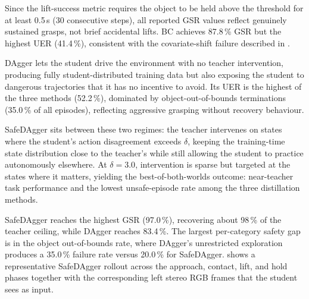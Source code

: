 Since the lift-success metric requires the object to be held above the threshold for at least 0.5\,s (30 consecutive steps), all reported \ac{GSR} values reflect genuinely sustained grasps, not brief accidental lifts.
\ac{BC} achieves 87.8\,\% \ac{GSR} but the highest \ac{UER} (41.4\,\%), consistent with the covariate-shift failure described in .

DAgger lets the student drive the environment with no teacher intervention, producing fully student-distributed training data but also exposing the student to dangerous trajectories that it has no incentive to avoid.
Its \ac{UER} is the highest of the three methods (52.2\,\%), dominated by object-out-of-bounds terminations (35.0\,\% of all episodes), reflecting aggressive grasping without recovery behaviour.

SafeDAgger sits between these two regimes: the teacher intervenes on states where the student's action disagreement exceeds $\delta$, keeping the training-time state distribution close to the teacher's while still allowing the student to practice autonomously elsewhere.
At $\delta = 3.0$, intervention is sparse but targeted at the states where it matters, yielding the best-of-both-worlds outcome: near-teacher task performance and the lowest unsafe-episode rate among the three distillation methods.

SafeDAgger reaches the highest \ac{GSR} (97.0\,\%), recovering about 98\,\% of the teacher ceiling, while DAgger reaches 83.4\,\%.
The largest per-category safety gap is in the object out-of-bounds rate, where DAgger's unrestricted exploration produces a 35.0\,\% failure rate versus 20.0\,\% for SafeDAgger.
 shows a representative SafeDAgger rollout across the approach, contact, lift, and hold phases together with the corresponding left stereo RGB frames that the student sees as input.

